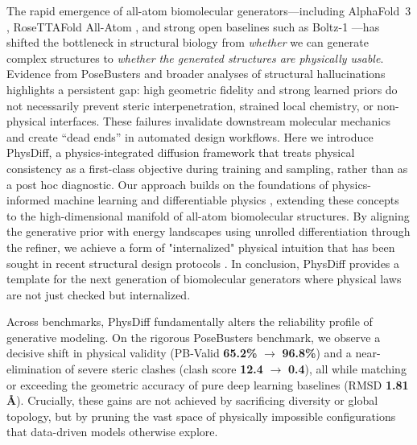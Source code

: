 \documentclass[twocolumn,10pt]{article}
\newcommand{\modelname}{PhysDiff}
\newcommand{\OpenBaseline}{Boltz-1}
\begin{document}
The rapid emergence of all-atom biomolecular generators---including AlphaFold~3 \cite{abramson2024accurate}, RoseTTAFold All-Atom \cite{krishna2024generalized}, and strong open baselines such as \OpenBaseline{} \cite{wohlwend2024boltz}---has shifted the bottleneck in structural biology from \emph{whether} we can generate complex structures to \emph{whether the generated structures are physically usable}.
Evidence from PoseBusters \cite{buttenschoen2024posebusters} and broader analyses of structural hallucinations \cite{wong2024structural} highlights a persistent gap: high geometric fidelity and strong learned priors do not necessarily prevent steric interpenetration, strained local chemistry, or non-physical interfaces. These failures invalidate downstream molecular mechanics and create ``dead ends'' in automated design workflows.
Here we introduce \modelname{}, a physics-integrated diffusion framework that treats physical consistency as a first-class objective during training and sampling, rather than as a post hoc diagnostic. Our approach builds on the foundations of physics-informed machine learning \cite{raissi2019physics} and differentiable physics \cite{jaxmd2020,torchmd2020,zhao2025differentiable}, extending these concepts to the high-dimensional manifold of all-atom biomolecular structures. By aligning the generative prior with energy landscapes using unrolled differentiation through the refiner, we achieve a form of "internalized" physical intuition that has been sought in recent structural design protocols \cite{brown2024computational}.
In conclusion, \modelname{} provides a template for the next generation of biomolecular generators where physical laws are not just checked but internalized.

Across benchmarks, \modelname{} fundamentally alters the reliability profile of generative modeling.
On the rigorous PoseBusters benchmark, we observe a decisive shift in physical validity (PB-Valid \textbf{65.2\%} $\to$ \textbf{96.8\%}) and a near-elimination of severe steric clashes (clash score \textbf{12.4} $\to$ \textbf{0.4}), all while matching or exceeding the geometric accuracy of pure deep learning baselines (RMSD \textbf{1.81\,\AA{}}).
Crucially, these gains are not achieved by sacrificing diversity or global topology, but by pruning the vast space of physically impossible configurations that data-driven models otherwise explore.
\end{document}
